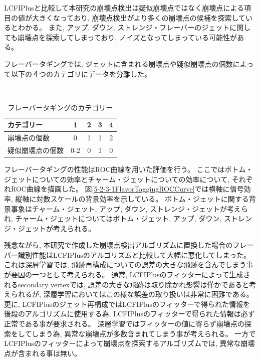 LCFIPlusと比較して本研究の崩壊点検出は疑似崩壊点ではなく崩壊点による項目の値が大きくなっており, 崩壊点検出がより多くの崩壊点の候補を探索しているとわかる。
また, アップ, ダウン, ストレンジ・フレーバーのジェットに関しても崩壊点を探索してしまっており, ノイズとなってしまっている可能性がある。

フレーバータギングでは, ジェットに含まれる崩壊点や疑似崩壊点の個数によって以下の$４$つのカテゴリにデータを分離した。

\begin{table}[htb]
 \centering
　\small
  \caption{フレーバータギングのカテゴリー}
  \begin{tabular}{l c c c c}\hline
    カテゴリー & 1 & 2 & 3 & 4\\\hline\hline
    崩壊点の個数 & 0 & 1 & 1 & 2\\
    疑似崩壊点の個数 & 0-2 & 0 & 1 & 0\\\hline
  \end{tabular}
  \label{TheNumberofReconstructedVertices}
\end{table}

フレーバータギングの性能はROC曲線を用いた評価を行う。
ここではボトム・ジェットについての効率とチャーム・ジェットについての効率について, それぞれROC曲線を描画した。
図\ref{5-2-3-1FlavorTaggingROCCurve}では横軸に信号効率, 縦軸に対数スケールの背景効率を示している。
ボトム・ジェットに関する背景事象はチャーム・ジェット, アップ, ダウン, ストレンジ・ジェットが考えられ, チャーム・ジェットについてはボトム・ジェット, アップ, ダウン, ストレンジ・ジェットが考えられる。

残念ながら, 本研究で作成した崩壊点検出アルゴリズムに置換した場合のフレーバー識別性能はLCFIPlusのアルゴリズムと比較して大幅に悪化してしまった。
これは深層学習では, 飛跡再構成についての誤差の大きな飛跡を含んでしまう事が要因の一つとして考えられる。
通常, LCFIPlusのフィッターによって生成されるsecondary vertexでは, 誤差の大きな飛跡は取り除かれ影響は僅かであると考えられるが, 深層学習においてはこの様な誤差の取り扱いは非常に困難である。
更に, LCFIPlusのジェット再構成ではLCFIPlusのフィッターで得られた情報を後段のアルゴリズムに使用する為, LCFIPlusのフィッターで得られた情報は必ず正常である事が要求される。
深層学習ではフィッターの値に寄らず崩壊点の探索をしてしまう為, 異常な崩壊点が多数含まれてしまう事が考えられる。
一方でLCFIPlusのフィッターによって崩壊点を探索するアルゴリズムでは, 異常な崩壊点が含まれる事は無い。

